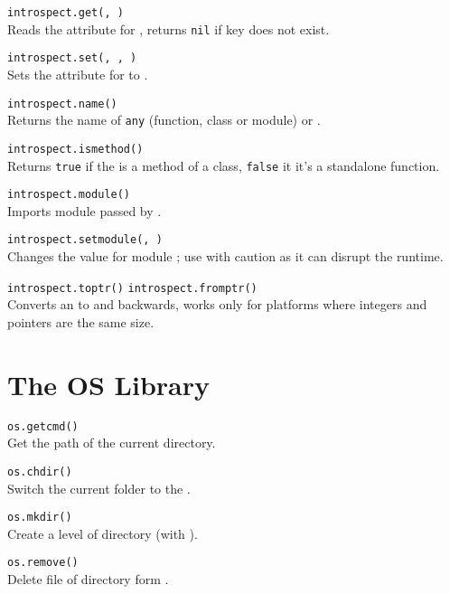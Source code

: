 \hangpar \texttt{introspect.get(}\texttt{, }\texttt{)} \\
Reads the attribute  for , returns \texttt{nil} if key does not exist.

\hangpar \texttt{introspect.set(}\texttt{, }\texttt{, }\texttt{)} \\
Sets the attribute  for  to .

\hangpar \texttt{introspect.name(}\texttt{)} \\
Returns the name of \texttt{any} (function, class or module) or .

\hangpar \texttt{introspect.ismethod(}\texttt{)} \\
Returns \texttt{true} if the  is a method of a class, \texttt{false} it it's a standalone function.

\hangpar \texttt{introspect.module(}\texttt{)} \\
Imports module passed by .

\hangpar \texttt{introspect.setmodule(}\texttt{, }\texttt{)} \\
Changes the value for module ; use with caution as it can disrupt the runtime.

\hangpar \texttt{introspect.toptr(}\texttt{)}  \texttt{introspect.fromptr(}\texttt{)} \\
Converts an  to  and backwards, works only for platforms where integers and pointers are the same size.

\section*{The OS Library}

\hangpar \texttt{os.getcmd()} \\
Get the path of the current directory.

\hangpar \texttt{os.chdir(}\texttt{)} \\
Switch the current folder to the .

\hangpar \texttt{os.mkdir(}\texttt{)} \\
Create a level of directory (with ).

\hangpar \texttt{os.remove(}\texttt{)} \\
Delete file of directory form .

